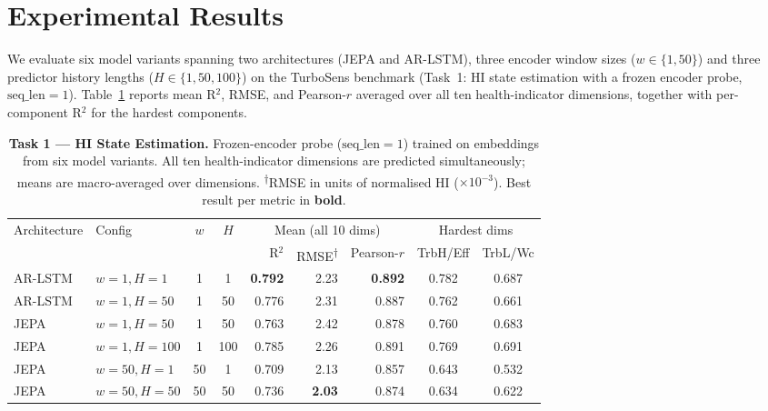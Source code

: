 
\section{Experimental Results}
\label{sec:results}

We evaluate six model variants spanning two architectures (JEPA and AR-LSTM),
three encoder window sizes ($w \in \{1, 50\}$) and three predictor history
lengths ($H \in \{1, 50, 100\}$) on the TurboSens benchmark (Task~1: HI state
estimation with a frozen encoder probe, $\mathrm{seq\_len}=1$).
Table~\ref{tab:task1} reports mean R$^2$, RMSE, and Pearson-$r$ averaged over
all ten health-indicator dimensions, together with per-component R$^2$ for the
hardest components.

\begin{table}[t]
\centering
\caption{
  \textbf{Task 1 — HI State Estimation.}
  Frozen-encoder probe ($\mathrm{seq\_len}{=}1$) trained on embeddings from
  six model variants.  All ten health-indicator dimensions are predicted
  simultaneously; means are macro-averaged over dimensions.
  \textsuperscript{†}RMSE in units of normalised HI ($\times 10^{-3}$).
  Best result per metric in \textbf{bold}.
}
\label{tab:task1}
\setlength{\tabcolsep}{5pt}
\begin{tabular}{llcc rrr cc}
\toprule
\multirow{2}{*}{Architecture} & \multirow{2}{*}{Config} &
  \multirow{2}{*}{$w$} & \multirow{2}{*}{$H$} &
  \multicolumn{3}{c}{Mean (all 10 dims)} &
  \multicolumn{2}{c}{Hardest dims} \\
\cmidrule(lr){5-7}\cmidrule(lr){8-9}
 & & & & R$^2$ & RMSE\textsuperscript{†} & Pearson-$r$ & TrbH/Eff & TrbL/Wc \\
\midrule
AR-LSTM & $w{=}1,H{=}1$  & 1 &  1 & \textbf{0.792} & 2.23 & \textbf{0.892} & 0.782 & 0.687 \\
AR-LSTM & $w{=}1,H{=}50$ & 1 & 50 & 0.776          & 2.31 & 0.887          & 0.762 & 0.661 \\
\midrule
JEPA    & $w{=}1,H{=}50$ & 1 &  50 & 0.763          & 2.42 & 0.878          & 0.760 & 0.683 \\
JEPA    & $w{=}1,H{=}100$& 1 & 100 & 0.785          & 2.26 & 0.891          & 0.769 & 0.691 \\
JEPA    & $w{=}50,H{=}1$ & 50&   1 & 0.709          & 2.13 & 0.857          & 0.643 & 0.532 \\
JEPA    & $w{=}50,H{=}50$& 50&  50 & 0.736          & \textbf{2.03} & 0.874 & 0.634 & 0.622 \\
\bottomrule
\end{tabular}
\end{table}

